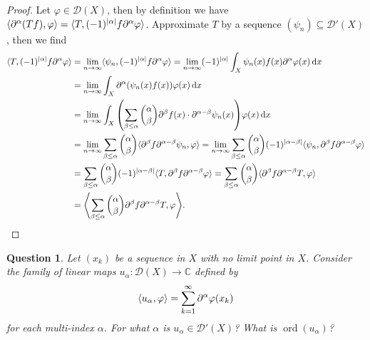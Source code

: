 \documentclass{article}
\theoremstyle{plain}
\newtheorem{question}{Question}
\theoremstyle{remark}
\renewcommand{\phi}{\varphi}
\newcommand{\Bb}{\mathbb}
\newcommand{\Cal}{\mathcal}
\newcommand{\CC}{\Bb C}
\newcommand{\DD}{\Cal D}
\DeclarePairedDelimiter{\ang}{\langle}{\rangle}
\newcommand\pt\partial
\DeclareMathOperator{\ord}{ord}
\begin{document}
\begin{proof}
	Let $\phi \in \DD(X)$, then by definition we have $\ang{\pt^\alpha(Tf), \phi} = \ang{T, (-1)^\abs{\alpha} f \pt^\alpha\phi}$. Approximate $T$ by a sequence $(\psi_n) \subseteq \DD'(X)$, then we find
	\begin{align*}
	\ang{T, (-1)^{\abs{\alpha}} f \pt^\alpha\phi} &= \lim_{n\to\infty} \ang{\psi_n,  (-1)^{\abs{\alpha}} f \pt^\alpha\phi} = \lim_{n\to\infty}  (-1)^{\abs{\alpha}} \int_X \psi_n(x) f(x) \pt^\alpha\phi(x) \dd{x} \\
	&= \lim_{n\to\infty} \int_X \pt^\alpha (\psi_n(x) f(x)) \phi(x) \dd{x} \\
	&= \lim_{n\to\infty} \int_X \qty(\sum_{\beta \leq \alpha} \binom\alpha\beta\pt^\beta f(x) \cdot \pt^{\alpha - \beta} \psi_n(x)) \phi(x) \dd{x} \\
	&= \lim_{n\to\infty} \sum_{\beta \leq \alpha} \binom\alpha\beta \ang{\pt^\beta f \pt^{\alpha - \beta} \psi_n, \phi} =  \lim_{n\to\infty} \sum_{\beta \leq \alpha} \binom\alpha\beta (-1)^{\abs{\alpha - \beta}} \ang{\psi_n, \pt^\beta f \pt^{\alpha - \beta} \phi} \\
	&= \sum_{\beta \leq \alpha} \binom\alpha\beta (-1)^{\abs{\alpha - \beta}} \ang{T, \pt^\beta f \pt^{\alpha - \beta} \phi} = \sum_{\beta \leq \alpha} \binom\alpha\beta \ang{\pt^\beta f \pt^{\alpha - \beta} T, \phi} \\
	&= \ang*{\sum_{\beta \leq \alpha} \binom{\alpha}{\beta} \pt^\beta f \pt^{\alpha - \beta}T, \phi}. 
	\end{align*}
\end{proof}

\begin{question}
	Let $(x_k)$ be a sequence in $X$ with no limit point in $X$. Consider the family of linear maps
	$u_\alpha \colon \DD(X) \to \CC$ defined by 
	\[ \ang{u_\alpha, \phi} = \sum_{k=1}^\infty \pt^\alpha \phi(x_k)
	 \]
	 for each multi-index $\alpha$. For what $\alpha$ is $u_\alpha \in \DD'(X)$? What is $\ord(u_\alpha)$? 
\end{question}
\end{document}
